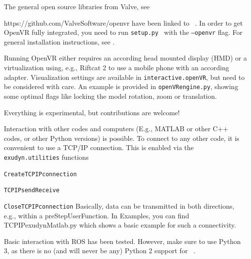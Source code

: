  \label{sec:exudynOpenVR}
%
The general open source libraries from Valve, see
\bi
\item[] https://github.com/ValveSoftware/openvr
\ei
have been linked to \codeName\ . In order to get OpenVR fully integrated, you need to run \texttt{setup.py} \codeName\ with the \texttt{--openvr} flag. For general installation instructions, see .

Running OpenVR either requires an according head mounted display (HMD) or a virtualization using, e.g., Riftcat 2 to use a mobile phone with an according adapter. Visualization settings are available in \texttt{interactive.openVR}, but need to be considered with care.
An example is provided in \texttt{openVRengine.py}, showing some optimal flags like locking the model rotation, zoom or translation.

Everything is experimental, but contributions are welcome!

 \label{sec:interactionOtherCodes}
%
Interaction with other codes and computers (E.g., MATLAB or other C++ codes, or other Python versions)
is possible. 
To connect to any other code, it is convenient to use a TCP/IP connection. This is enabled via 
the \texttt{exudyn.utilities} functions
\bi
\item \texttt{CreateTCPIPconnection}
\item \texttt{TCPIPsendReceive}
\item \texttt{CloseTCPIPconnection}
\ei
Basically, data can be transmitted in both directions, e.g., within a preStepUserFunction. In Examples, you can find 
 TCPIPexudynMatlab.py which shows a basic example for such a connectivity.

 \label{sec:exudynROS}
%
Basic interaction with ROS has been tested. However, make sure to use Python 3, as there is no (and will never be any) Python 2
support for \codeName\ .






